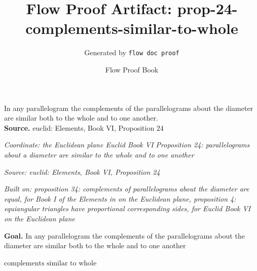 \documentclass[11pt]{article}
\title{Flow Proof Artifact: prop-24-complements-similar-to-whole}
\author{Generated by \texttt{flow doc proof}}
\date{Flow Proof Book}
\theoremstyle{definition}
\begin{document}
\maketitle
In any parallelogram the complements of the parallelograms about the diameter are similar both to the whole and to one another.\\[0.5em]
\textbf{Source.} euclid: Elements, Book VI, Proposition 24\\[0.5em]
\bigskip
{}\par
\smallskip\noindent\textit{Coordinate: the Euclidean plane \cdot Euclid Book VI \cdot Proposition 24: parallelograms about a diameter are similar to the whole and to one another}\par
\smallskip\noindent\textit{Source: euclid: Elements, Book VI, Proposition 24}\par
\smallskip\noindent\textit{Built on: proposition 34: complements of parallelograms about the diameter are equal, for Book I of the Elements in on the Euclidean plane, proposition 4: equiangular triangles have proportional corresponding sides, for Euclid Book VI on the Euclidean plane}\par
\medskip
\noindent\textbf{Goal.} In any parallelogram the complements of the parallelograms about the diameter are similar both to the whole and to one another\par
\noindent$\displaystyle \text{complements similar to whole}$\par
\medskip
\noindent
\end{document}

